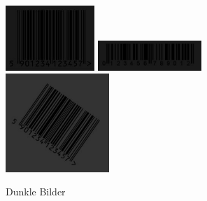 \begin{figure}[H]
  \centering
  \includegraphics[width=0.30\textwidth]{img/EAN13/dark_01_90.jpg}
  \includegraphics[width=0.35\textwidth]{img/EAN13/dark_02_90.jpg}
  \includegraphics[width=0.35\textwidth]{img/EAN13/blurrydarkrotate_01_07_80_35.jpg}
  \caption{Dunkle Bilder}
  \label{fig:eandark}
\end{figure}


